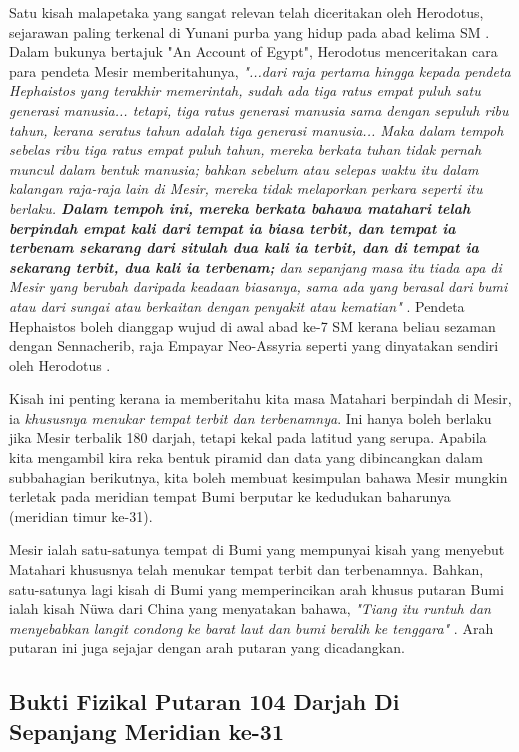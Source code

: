 \documentclass[10pt,twocolumn,letterpaper]{article}
\begin{document}
Satu kisah malapetaka yang sangat relevan telah diceritakan oleh Herodotus, sejarawan paling terkenal di Yunani purba yang hidup pada abad kelima SM \cite{31}. Dalam bukunya bertajuk "An Account of Egypt", Herodotus menceritakan cara para pendeta Mesir memberitahunya, \textit{"...dari raja pertama hingga kepada pendeta Hephaistos yang terakhir memerintah, sudah ada tiga ratus empat puluh satu generasi manusia... tetapi, tiga ratus generasi manusia sama dengan sepuluh ribu tahun, kerana seratus tahun adalah tiga generasi manusia... Maka dalam tempoh sebelas ribu tiga ratus empat puluh tahun, mereka berkata tuhan tidak pernah muncul dalam bentuk manusia; bahkan sebelum atau selepas waktu itu dalam kalangan raja-raja lain di Mesir, mereka tidak melaporkan perkara seperti itu berlaku. \textbf{Dalam tempoh ini, mereka berkata bahawa matahari telah berpindah empat kali dari tempat ia biasa terbit, dan tempat ia terbenam sekarang dari situlah dua kali ia terbit, dan di tempat ia sekarang terbit, dua kali ia terbenam;} dan sepanjang masa itu tiada apa di Mesir yang berubah daripada keadaan biasanya, sama ada yang berasal dari bumi atau dari sungai atau berkaitan dengan penyakit atau kematian"} \cite{32}. Pendeta Hephaistos boleh dianggap wujud di awal abad ke-7 SM kerana beliau sezaman dengan Sennacherib, raja Empayar Neo-Assyria seperti yang dinyatakan sendiri oleh Herodotus \cite{32,33,34}.

Kisah ini penting kerana ia memberitahu kita masa Matahari berpindah di Mesir, ia \textit{khususnya menukar tempat terbit dan terbenamnya}. Ini hanya boleh berlaku jika Mesir terbalik 180 darjah, tetapi kekal pada latitud yang serupa. Apabila kita mengambil kira reka bentuk piramid dan data yang dibincangkan dalam subbahagian berikutnya, kita boleh membuat kesimpulan bahawa Mesir mungkin terletak pada meridian tempat Bumi berputar ke kedudukan baharunya (meridian timur ke-31).

Mesir ialah satu-satunya tempat di Bumi yang mempunyai kisah yang menyebut Matahari khususnya telah menukar tempat terbit dan terbenamnya. Bahkan, satu-satunya lagi kisah di Bumi yang memperincikan arah khusus putaran Bumi ialah kisah Nüwa dari China yang menyatakan bahawa, \textit{"Tiang itu runtuh dan menyebabkan langit condong ke barat laut dan bumi beralih ke tenggara"} \cite{8}. Arah putaran ini juga sejajar dengan arah putaran yang dicadangkan.

\subsection{Bukti Fizikal Putaran 104 Darjah Di Sepanjang Meridian ke-31}
\end{document}
